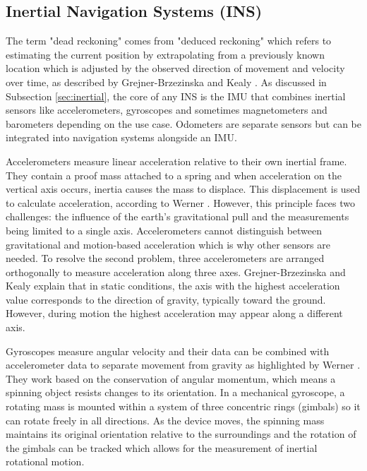 \subsection{Inertial Navigation Systems (INS)}
\label{sec:ins}
The term "dead reckoning" comes from "deduced reckoning" which refers to estimating the current position by extrapolating from a previously known location which is adjusted by the observed direction of movement and velocity over time, as described by Grejner-Brzezinska and Kealy \cite{grejner2004positioning}.
As discussed in Subsection \ref{sec:inertial}, the core of any \acs{INS} is the \acs{IMU} that combines inertial sensors like accelerometers, gyroscopes and sometimes magnetometers and barometers depending on the use case. 
Odometers are separate sensors but can be integrated into navigation systems alongside an \acs{IMU}.

Accelerometers measure linear acceleration relative to their own inertial frame.
They contain a proof mass attached to a spring and when acceleration on the vertical axis occurs, inertia causes the mass to displace.
This displacement is used to calculate acceleration, according to Werner \cite{werner2014indoor}.
However, this principle faces two challenges: the influence of the earth's gravitational pull and the measurements being limited to a single axis.
Accelerometers cannot distinguish between gravitational and motion-based acceleration which is why other sensors are needed.
To resolve the second problem, three accelerometers are arranged orthogonally to measure acceleration along three axes.
Grejner-Brzezinska and Kealy \cite{grejner2004positioning} explain that in static conditions, the axis with the highest acceleration value corresponds to the direction of gravity, typically toward the ground. 
However, during motion the highest acceleration may appear along a different axis.

Gyroscopes measure angular velocity and their data can be combined with accelerometer data to separate movement from gravity as highlighted by Werner \cite{werner2014indoor}. 
They work based on the conservation of angular momentum, which means a spinning object resists changes to its orientation.
In a mechanical gyroscope, a rotating mass is mounted within a system of three concentric rings (gimbals) so it can rotate freely in all directions. 
As the device moves, the spinning mass maintains its original orientation relative to the surroundings and the rotation of the gimbals can be tracked which allows for the measurement of inertial rotational motion.

